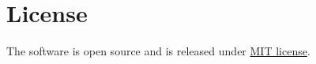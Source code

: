 \section{License}
The software is open source and is released under \href{https://github.com/MarcoFavorito/rltg/blob/master/LICENSE}{MIT license}.